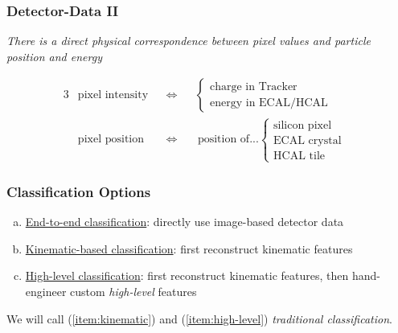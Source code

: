 \documentclass[14pt, t]{beamer}
\begin{document}
\begin{frame}
    \frametitle{Detector-Data II}
    \begin{center}
        \textit{There is a direct physical correspondence between pixel values and particle position and energy}
    \end{center}

    \vspace{-10mm}

    \begin{alignat*}{3}
        & \text{pixel intensity} && \iff &&
        \begin{cases}
            \text{charge in Tracker} &\\
            \text{energy in ECAL/HCAL} &
        \end{cases}\\[2mm]
        & \text{pixel position} && \iff && \ \text{position of...}
        \begin{cases}
            \text{silicon pixel} &\\
            \text{ECAL crystal} &\\
            \text{HCAL tile} &
        \end{cases}
    \end{alignat*}
    
    
\end{frame}

\begin{frame}
    \frametitle{Classification Options}
    \begin{enumerate}[(a)]
        \setlength{\itemsep}{5mm}
        \item \label{item:end-end} {\large \underline{End-to-end classification}}: directly use image-based detector data

        \item \label{item:kinematic}
        {\large \underline{Kinematic-based classification}}: first reconstruct kinematic features

        \item \label{item:high-level} {\large \underline{High-level classification}}: first reconstruct kinematic features, then hand-engineer custom \textit{high-level} features
    
    \end{enumerate}
    We will call (\ref{item:kinematic}) and (\ref{item:high-level}) \textit{traditional classification}.
    
\end{frame}
\end{document}
